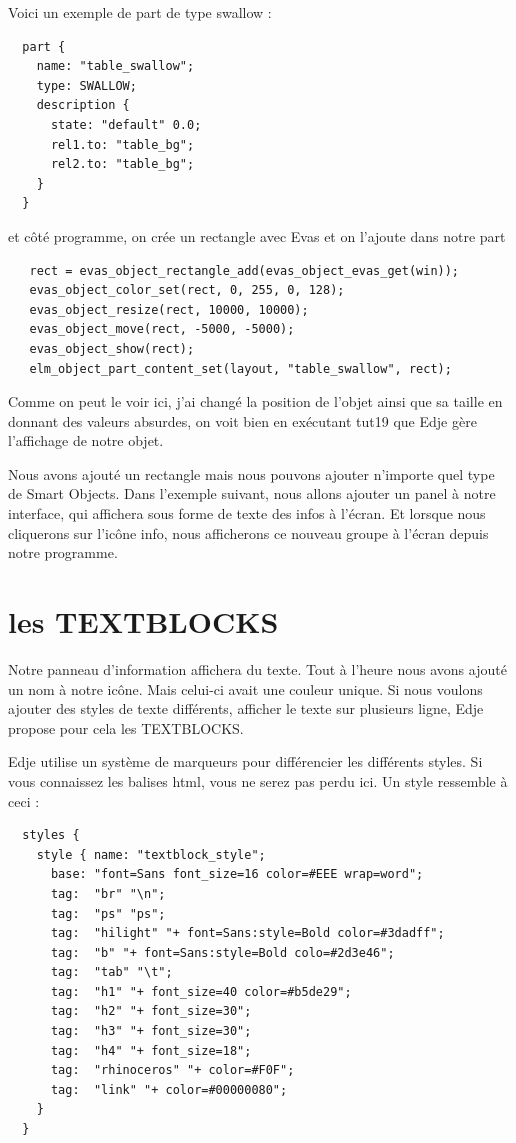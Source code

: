 \documentclass[a4paper]{efr}
\begin{document}
Voici un exemple de part de type swallow :
\begin{lstlisting}
  part {
    name: "table_swallow";
    type: SWALLOW;
    description {
      state: "default" 0.0;
      rel1.to: "table_bg";
      rel2.to: "table_bg";
    }
  }
\end{lstlisting}

et côté programme, on crée un rectangle avec Evas et on l'ajoute dans notre part
\begin{lstlisting}
   rect = evas_object_rectangle_add(evas_object_evas_get(win));
   evas_object_color_set(rect, 0, 255, 0, 128);
   evas_object_resize(rect, 10000, 10000);
   evas_object_move(rect, -5000, -5000);
   evas_object_show(rect);
   elm_object_part_content_set(layout, "table_swallow", rect);
\end{lstlisting}

Comme on peut le voir ici, j'ai changé la position de l'objet ainsi que sa
taille en donnant des valeurs absurdes, on voit bien en exécutant tut19 que
Edje gère l'affichage de notre objet.

Nous avons ajouté un rectangle mais nous pouvons ajouter n'importe quel type
de Smart Objects.
Dans l'exemple suivant, nous allons ajouter un panel à notre interface, qui
affichera sous forme de texte des infos à l'écran. Et lorsque nous cliquerons
sur l'icône info, nous afficherons ce nouveau groupe à l'écran depuis notre
programme.

\section{les TEXTBLOCKS}

Notre panneau d'information affichera du texte. Tout à l'heure nous avons
ajouté un nom à notre icône. Mais celui-ci avait une couleur unique. Si nous
voulons ajouter des styles de texte différents, afficher le texte sur plusieurs
ligne, Edje propose pour cela les TEXTBLOCKS.

Edje utilise un système de marqueurs pour différencier les différents styles.
Si vous connaissez les balises html, vous ne serez pas perdu ici.
Un style ressemble à ceci :
\begin{lstlisting}
  styles {
    style { name: "textblock_style";
      base: "font=Sans font_size=16 color=#EEE wrap=word";
      tag:  "br" "\n";
      tag:  "ps" "ps";
      tag:  "hilight" "+ font=Sans:style=Bold color=#3dadff";
      tag:  "b" "+ font=Sans:style=Bold colo=#2d3e46";
      tag:  "tab" "\t";
      tag:  "h1" "+ font_size=40 color=#b5de29";
      tag:  "h2" "+ font_size=30";
      tag:  "h3" "+ font_size=30";
      tag:  "h4" "+ font_size=18";
      tag:  "rhinoceros" "+ color=#F0F";
      tag:  "link" "+ color=#00000080";
    }
  }
\end{lstlisting}
\end{document}
